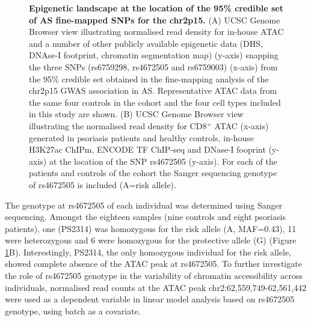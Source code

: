\begin{figure}[htbp]
\caption[Epigenetic landscape at the location of the 95\% credible set of AS fine-mapped SNPs for the chr2p15.]{\textbf{Epigenetic landscape at the location of the 95\% credible set of AS fine-mapped SNPs for the chr2p15.} (A) UCSC Genome Browser view illustrating normalised read density for in-house ATAC and a number of other publicly available epigenetic data (DHS, DNAse-I footprint, chromatin segmentation map) (y-axis) snapping the three SNPs (rs6759298, rs4672505 and rs6759003) (x-axis) from the 95\% credible set obtained in the fine-mapping analysis of the chr2p15 GWAS association in AS. Representative ATAC data from the same four controls in the cohort and the four cell types included in this study are shown. (B) UCSC Genome Browser view illustrating the normalised read density for CD8$^+$ ATAC (x-axis) generated in psoriasis patients and healthy controls, in-house H3K27ac ChIPm, ENCODE TF ChIP-seq and DNase-I fooprint (y-axis) at the location of the SNP rs4672505 (y-axis). For each of the patients and controls of the cohort the Sanger sequencing genotype of rs4672505 is included (A=risk allele).}
\label{figure:ATAC_PS_CTL_chr2p15_rs4672505}
\end{figure} 





The genotype at rs4672505 of each individual was determined using Sanger sequencing. Amongst the eighteen samples (nine controls and eight psoriasis patients), one (PS2314) was homozygous for the risk allele (A, MAF=0.43), 11 were heterozygous and 6 were homozygous for the protective allele (G) (Figure \ref{figure:ATAC_PS_CTL_chr2p15_rs4672505}B). Interestingly, PS2314, the only homozygous individual for the risk allele, showed complete absence of the ATAC peak at rs4672505. To further investigate the role of rs4672505 genotype in the variability of chromatin accessibility across individuals, normalised read counts at the ATAC peak chr2:62,559,749-62,561,442 were used as a dependent variable in linear model analysis based on rs4672505 genotype, using batch as a covariate. 



